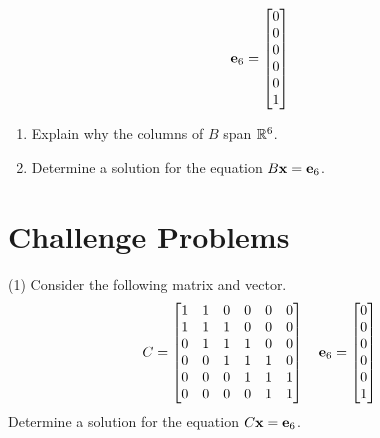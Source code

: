 \begin{tasks}[resume, style=enumerate]
\begin{displaymath}
    \mathbf e_6 =
    \begin{bmatrix}
      0 \\ 0 \\ 0 \\ 0 \\ 0 \\ 1
    \end{bmatrix}
  \end{displaymath}
  \begin{enumerate}[label=(\alph*)]
  \item
    Explain why the columns of $B$ span $\mathbb R^6$.
  \item
    Determine a solution for the equation $B \mathbf x = \mathbf e_6$.
  \end{enumerate}
\end{tasks}

\section{Challenge Problems}

\begin{tasks}[resume, style=enumerate](1)
\task
  Consider the following matrix and vector.
  \begin{displaymath}
    C =
    \begin{bmatrix}
      1 & 1 & 0 & 0 & 0 & 0 \\
      1 & 1 & 1 & 0 & 0 & 0 \\
      0 & 1 & 1 & 1 & 0 & 0 \\
      0 & 0 & 1 & 1 & 1 & 0 \\
      0 & 0 & 0 & 1 & 1 & 1 \\
      0 & 0 & 0 & 0 & 1 & 1
    \end{bmatrix}
    \quad
    \mathbf e_6 =
    \begin{bmatrix}
      0 \\ 0 \\ 0 \\ 0 \\ 0 \\ 1
    \end{bmatrix}
  \end{displaymath}
  Determine a solution for the equation $C \mathbf x = \mathbf e_6$.
\end{tasks}
